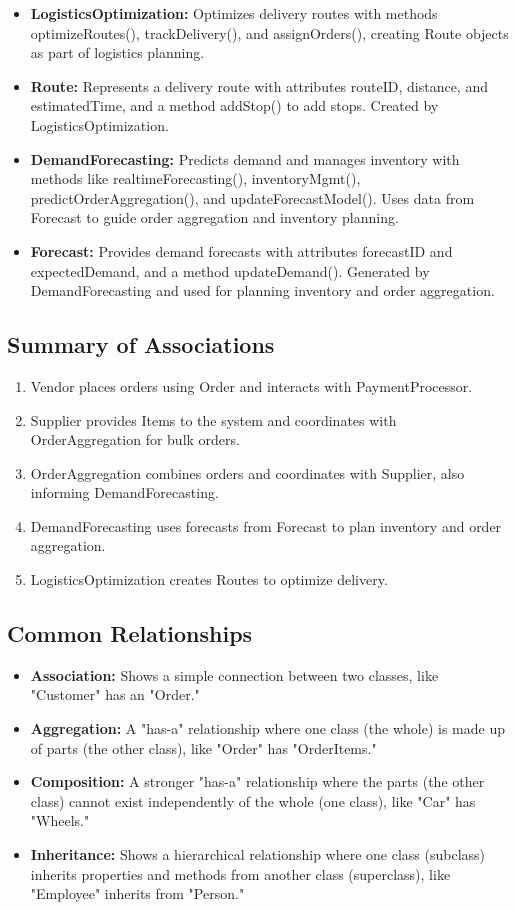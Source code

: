 \begin{itemize}
    \item \textbf{LogisticsOptimization:} Optimizes delivery routes with methods optimizeRoutes(), trackDelivery(), and assignOrders(), creating Route objects as part of logistics planning.

    \item \textbf{Route:} Represents a delivery route with attributes routeID, distance, and estimatedTime, and a method addStop() to add stops. Created by LogisticsOptimization.

    \item \textbf{DemandForecasting:} Predicts demand and manages inventory with methods like realtimeForecasting(), inventoryMgmt(), predictOrderAggregation(), and updateForecastModel(). Uses data from Forecast to guide order aggregation and inventory planning.

    \item \textbf{Forecast:} Provides demand forecasts with attributes forecastID and expectedDemand, and a method updateDemand(). Generated by DemandForecasting and used for planning inventory and order aggregation.
\end{itemize}
\subsection{Summary of Associations}
\begin{enumerate}
    \item Vendor places orders using Order and interacts with PaymentProcessor.
    \item Supplier provides Items to the system and coordinates with OrderAggregation for bulk orders.
    \item OrderAggregation combines orders and coordinates with Supplier, also informing DemandForecasting.
    \item DemandForecasting uses forecasts from Forecast to plan inventory and order aggregation.
    \item LogisticsOptimization creates Routes to optimize delivery.
\end{enumerate}

\subsection{Common Relationships}
\begin{itemize}
    \item \textbf{Association:} Shows a simple connection between two classes, like "Customer" has an "Order."
    \item \textbf{Aggregation:} A "has-a" relationship where one class (the whole) is made up of parts (the other class), like "Order" has "OrderItems."
    \item \textbf{Composition:} A stronger "has-a" relationship where the parts (the other class) cannot exist independently of the whole (one class), like "Car" has "Wheels."
    \item \textbf{Inheritance:} Shows a hierarchical relationship where one class (subclass) inherits properties and methods from another class (superclass), like "Employee" inherits from "Person."
\end{itemize}

